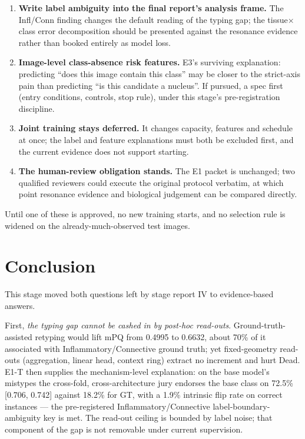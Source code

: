 \documentclass[11pt,a4paper]{article}
\begin{document}
\begin{enumerate}
\item \textbf{Write label ambiguity into the final report's analysis frame.} The Infl/Conn finding changes the default reading of the typing gap; the tissue$\times$class error decomposition should be presented against the resonance evidence rather than booked entirely as model loss.
\item \textbf{Image-level class-absence risk features.} E3's surviving explanation: predicting ``does this image contain this class'' may be closer to the strict-axis pain than predicting ``is this candidate a nucleus''. If pursued, a spec first (entry conditions, controls, stop rule), under this stage's pre-registration discipline.
\item \textbf{Joint training stays deferred.} It changes capacity, features and schedule at once; the label and feature explanations must both be excluded first, and the current evidence does not support starting.
\item \textbf{The human-review obligation stands.} The E1 packet is unchanged; two qualified reviewers could execute the original protocol verbatim, at which point resonance evidence and biological judgement can be compared directly.
\end{enumerate}

Until one of these is approved, no new training starts, and no selection rule is widened on the already-much-observed test images.

\section{Conclusion}

This stage moved both questions left by stage report IV to evidence-based answers.

First, \emph{the typing gap cannot be cashed in by post-hoc read-outs}. Ground-truth-assisted retyping would lift mPQ from 0.4995 to 0.6632, about 70\% of it associated with Inflammatory/Connective ground truth; yet fixed-geometry read-outs (aggregation, linear head, context ring) extract no increment and hurt Dead. E1-T then supplies the mechanism-level explanation: on the base model's mistypes the cross-fold, cross-architecture jury endorses the base class on 72.5\% [0.706, 0.742] against 18.2\% for GT, with a 1.9\% intrinsic flip rate on correct instances --- the pre-registered Inflammatory/Connective label-boundary-ambiguity key is met. The read-out ceiling is bounded by label noise; that component of the gap is not removable under current supervision.
\end{document}
